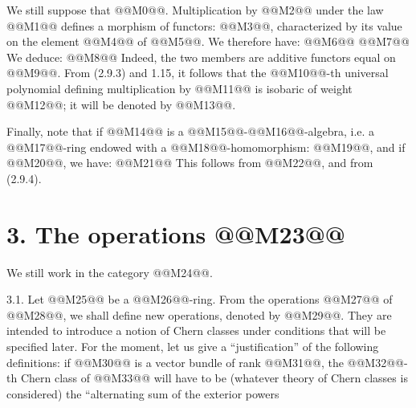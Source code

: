We still suppose that @@M0@@. Multiplication by @@M2@@ under the law @@M1@@ defines a morphism of functors: @@M3@@, characterized by its value on the element @@M4@@ of @@M5@@. We therefore have:
@@M6@@
@@M7@@
We deduce:
@@M8@@
Indeed, the two members are additive functors equal on @@M9@@. From (2.9.3) and 1.15, it follows that the @@M10@@-th universal polynomial defining multiplication by @@M11@@ is isobaric of weight @@M12@@; it will be denoted by @@M13@@.

Finally, note that if @@M14@@ is a @@M15@@-@@M16@@-algebra, i.e. a @@M17@@-ring endowed with a @@M18@@-homomorphism: @@M19@@, and if @@M20@@, we have:
@@M21@@
This follows from @@M22@@, and from (2.9.4).

\section*{3. The operations @@M23@@}

We still work in the category @@M24@@.

3.1. Let @@M25@@ be a @@M26@@-ring. From the operations @@M27@@ of @@M28@@, we shall define new operations, denoted by @@M29@@. They are intended to introduce a notion of Chern classes under conditions that will be specified later. For the moment, let us give a ``justification'' of the following definitions: if @@M30@@ is a vector bundle of rank @@M31@@, the @@M32@@-th Chern class of @@M33@@ will have to be (whatever theory of Chern classes is considered) the ``alternating sum of the exterior powers
